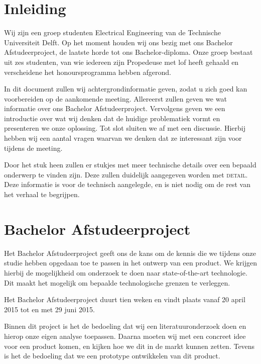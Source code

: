 \documentclass[oneside, a4paper, openany]{memoir}
\begin{document}


\frontmatter
\setcounter{page}{5}
\begin{titlingpage}
  \pagestyle{empty}
  \titleGM
\end{titlingpage}

\tableofcontents

\clearpage
\mainmatter

\chapter{Inleiding}
Wij zijn een groep studenten Electrical Engineering van de Technische Universiteit Delft. Op het moment houden wij ons bezig met ons Bachelor Afstudeerproject, de laatste horde tot ons Bachelor-diploma. Onze groep bestaat uit zes studenten, van wie iedereen zijn Propedeuse met lof heeft gehaald en verscheidene het honoursprogramma hebben afgerond.

In dit document zullen wij achtergrondinformatie geven, zodat u zich goed kan voorbereiden op de aankomende meeting. Allereerst zullen geven we wat informatie over ons Bachelor Afstudeerproject. Vervolgens geven we een introductie over wat wij denken dat de huidige problematiek vormt en presenteren we onze oplossing. Tot slot sluiten we af met een discussie. Hierbij hebben wij een aantal vragen waarvan we denken dat ze interessant zijn voor tijdens de meeting.

Door het stuk heen zullen er stukjes met meer technische details over een bepaald onderwerp te vinden zijn. Deze zullen duidelijk aangegeven worden met \textsc{detail}. Deze informatie is voor de technisch aangelegde, en is niet nodig om de rest van het verhaal te begrijpen.

\chapter{Bachelor Afstudeerproject}
Het Bachelor Afstudeerproject geeft ons de kans om de kennis die we tijdens onze studie hebben opgedaan toe te passen in het ontwerp van een product. We krijgen hierbij de mogelijkheid om onderzoek te doen naar state-of-the-art technologie. Dit maakt het mogelijk om bepaalde technologische grenzen te verleggen.

Het Bachelor Afstudeerproject duurt tien weken en vindt plaats vanaf 20 april 2015 tot en met 29 juni 2015.

Binnen dit project is het de bedoeling dat wij een literatuuronderzoek doen en hierop onze eigen analyse toepassen. Daarna moeten wij met een concreet idee voor een product komen, en kijken hoe we dit in de markt kunnen zetten. Tevens is het de bedoeling dat we een prototype ontwikkelen van dit product.
\end{document}
